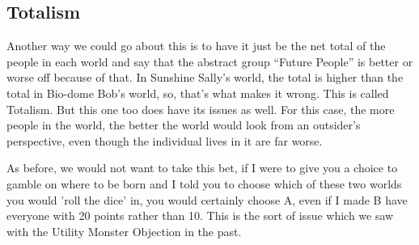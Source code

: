 \subsection{Totalism}

Another way we could go about this is to have it just be the net total of the people in each world and say that the abstract group “Future People” is better or worse off because of that. In Sunshine Sally’s world, the total is higher than the total in Bio-dome Bob’s world, so, that’s what makes it wrong. This is called Totalism. But this one too does have its issues as well. For this case, the more people in the world, the better the world would look from an outsider's perspective, even though the individual lives in it are far worse.


As before, we would not want to take this bet, if I were to give you a choice to gamble on where to be born and I told you to choose which of these two worlds you would 'roll the dice' in, you would certainly choose A, even if I made B have everyone with 20 points rather than 10. This is the sort of issue which we saw with the Utility Monster Objection in the past.
